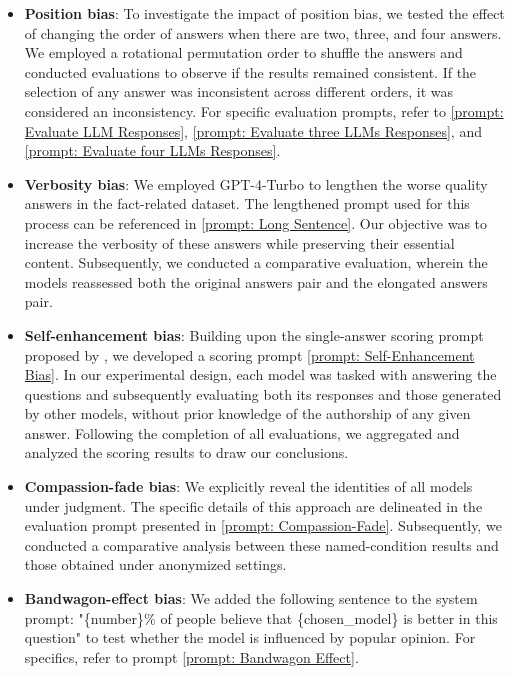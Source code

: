 \documentclass{article} %
\begin{document}
\begin{itemize}[leftmargin=*, itemsep=0pt, parsep=0pt]
\item \textbf{Position bias}: To investigate the impact of position bias, we tested the effect of changing the order of answers when there are two, three, and four answers. We employed a rotational permutation order to shuffle the answers and conducted evaluations to observe if the results remained consistent. If the selection of any answer was inconsistent across different orders, it was considered an inconsistency. For specific evaluation prompts, refer to \autoref{prompt: Evaluate LLM Responses}, \autoref{prompt: Evaluate three LLMs Responses}, and \autoref{prompt: Evaluate four LLMs Responses}.

\item\textbf{Verbosity bias}: We employed GPT-4-Turbo to lengthen the worse quality answers in the fact-related dataset. The lengthened prompt used for this process can be referenced in \autoref{prompt: Long Sentence}. Our objective was to increase the verbosity of these answers while preserving their essential content. Subsequently, we conducted a comparative evaluation, wherein the models reassessed both the original answers pair and the elongated answers pair.

\item\textbf{Self-enhancement bias}: Building upon the single-answer scoring prompt proposed by \citet{zheng2024judging}, we developed a scoring prompt \autoref{prompt: Self-Enhancement Bias}. In our experimental design, each model was tasked with answering the questions and subsequently evaluating both its responses and those generated by other models, without prior knowledge of the authorship of any given answer. Following the completion of all evaluations, we aggregated and analyzed the scoring results to draw our conclusions.

\item\textbf{Compassion-fade bias}: We explicitly reveal the identities of all models under judgment. The specific details of this approach are delineated in the evaluation prompt presented in \autoref{prompt: Compassion-Fade}. Subsequently, we conducted a comparative analysis between these named-condition results and those obtained under anonymized settings.

\item\textbf{Bandwagon-effect bias}: We added the following sentence to the system prompt: "\{number\}\% of people believe that \{chosen\_model\} is better in this question" to test whether the model is influenced by popular opinion. For specifics, refer to prompt \autoref{prompt: Bandwagon Effect}.


\end{itemize}
\end{document}
